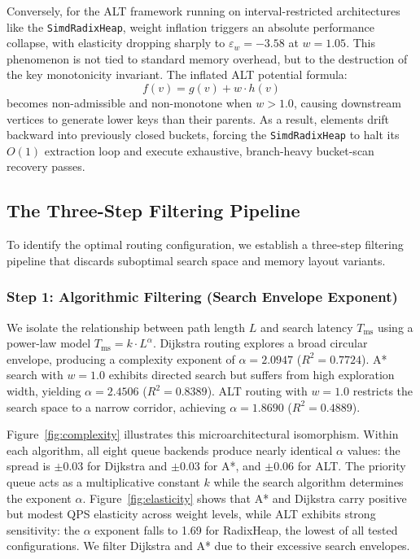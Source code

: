 Conversely, for the ALT framework running on interval-restricted architectures like the \texttt{SimdRadixHeap}, weight inflation triggers an absolute performance collapse, with elasticity dropping sharply to $\varepsilon_w = -3.58$ at $w=1.05$. This phenomenon is not tied to standard memory overhead, but to the destruction of the key monotonicity invariant. The inflated ALT potential formula:
\begin{equation}
f(v) = g(v) + w \cdot h(v)
\end{equation}
becomes non-admissible and non-monotone when $w > 1.0$, causing downstream vertices to generate lower keys than their parents. As a result, elements drift backward into previously closed buckets, forcing the \texttt{SimdRadixHeap} to halt its $O(1)$ extraction loop and execute exhaustive, branch-heavy bucket-scan recovery passes.

\subsection{The Three-Step Filtering Pipeline}

To identify the optimal routing configuration, we establish a three-step filtering pipeline that discards suboptimal search space and memory layout variants.

\subsubsection{Step 1: Algorithmic Filtering (Search Envelope Exponent)}
We isolate the relationship between path length $L$ and search latency $T_{\text{ms}}$ using a power-law model $T_{\text{ms}} = k \cdot L^{\alpha}$. 
Dijkstra routing explores a broad circular envelope, producing a complexity exponent of $\alpha = 2.0947$ ($R^2 = 0.7724$). 
A* search with $w=1.0$ exhibits directed search but suffers from high exploration width, yielding $\alpha = 2.4506$ ($R^2 = 0.8389$). 
ALT routing with $w=1.0$ restricts the search space to a narrow corridor, achieving $\alpha = 1.8690$ ($R^2 = 0.4889$). 

Figure~\ref{fig:complexity} illustrates this microarchitectural isomorphism. 
Within each algorithm, all eight queue backends produce nearly identical $\alpha$ values: the spread is $\pm 0.03$ for Dijkstra and $\pm 0.03$ for A*, and $\pm 0.06$ for ALT. 
The priority queue acts as a multiplicative constant $k$ while the search algorithm determines the exponent $\alpha$. 
Figure~\ref{fig:elasticity} shows that A* and Dijkstra carry positive but modest QPS elasticity across weight levels, while ALT exhibits strong sensitivity: the $\alpha$ exponent falls to 1.69 for RadixHeap, the lowest of all tested configurations. 
We filter Dijkstra and A* due to their excessive search envelopes.

